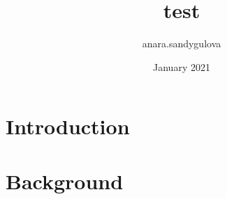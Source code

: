 \documentclass{article}
\title{test}
\author{anara.sandygulova }
\date{January 2021}
\begin{document}
\maketitle

\section{Introduction}

\section{Background}
\end{document}
